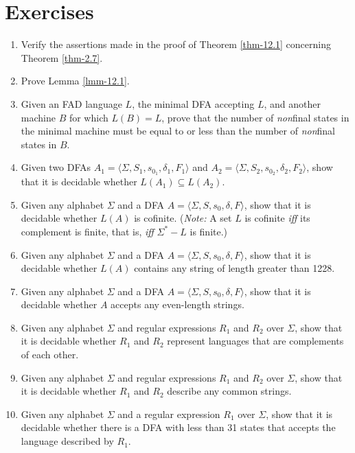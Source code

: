 \section*{Exercises}
\begin{enumerate}[{12.}1.]
\item Verify the assertions made in the proof of Theorem \ref{thm-12.1}
concerning Theorem \ref{thm-2.7}.

\item Prove Lemma \ref{lmm-12.1}.

\item Given an FAD language $L$, the minimal DFA accepting $L$, and another
machine $B$ for which $L(B)=L$, prove that the number of \emph{non}final states
in the minimal machine must be equal to or less than the number of
\emph{non}final states in $B$.

\item Given two DFAs $A_1=\langle\Sigma,S_1,s_{0_1},\delta_1,F_1\rangle$ and
$A_2=\langle\Sigma,S_2,s_{0_2},\delta_2,F_2\rangle$, show that it is decidable
whether $L(A_1)\subseteq L(A_2)$.

\item Given any alphabet $\Sigma$ and a DFA $A=\langle\Sigma,S,s_0,\delta,F
\rangle$, show that it is decidable whether $L(A)$ is cofinite. (\emph{Note:}
A set $L$ is cofinite \emph{iff} its complement is finite, that is, \emph{iff}
$\Sigma^*-L$ is finite.)

\item Given any alphabet $\Sigma$ and a DFA $A=\langle\Sigma,S,s_0,\delta,F
\rangle$, show that it is decidable whether $L(A)$ contains any string of length
greater than 1228.

\item Given any alphabet $\Sigma$ and a DFA $A=\langle\Sigma,S,s_0,\delta,F
\rangle$, show that it is decidable whether $A$ accepts any even-length strings.

\item Given any alphabet $\Sigma$ and regular expressions $R_1$ and $R_2$ over
$\Sigma$, show that it is decidable whether $R_1$ and $R_2$ represent languages
that are complements of each other.

\item Given any alphabet $\Sigma$ and regular expressions $R_1$ and $R_2$ over
$\Sigma$, show that it is decidable whether $R_1$ and $R_2$ describe any common
strings.

\item Given any alphabet $\Sigma$ and a regular expression $R_1$ over $\Sigma$,
show that it is decidable whether there is a DFA with less than 31 states that
accepts the language described by $R_1$.


\end{enumerate}
